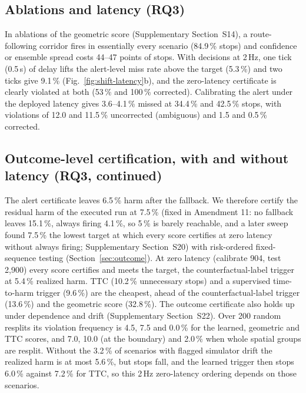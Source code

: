 \documentclass[lettersize,journal]{IEEEtran}
\begin{document}
\subsection{Ablations and latency (RQ3)}
\label{sec:ablation}
In ablations of the geometric score (Supplementary Section~S14), a route-following
corridor fires in essentially every scenario (84.9\,\% stops) and confidence or
ensemble spread costs 44--47 points of stops. With decisions at 2\,Hz, one tick (0.5\,s) of delay lifts the
alert-level miss rate above the target (5.3\,\%) and two ticks give 9.1\,\%
(Fig.~\ref{fig:shift-latency}b), and the zero-latency certificate is
clearly violated at both (53\,\% and 100\,\% corrected). Calibrating the
alert under the deployed latency gives 3.6--4.1\,\% missed at 34.4\,\% and
42.5\,\% stops, with violations of 12.0 and 11.5\,\% uncorrected (ambiguous)
and 1.5 and 0.5\,\% corrected.

\subsection{Outcome-level certification, with and without latency (RQ3, continued)}
\label{sec:res-outcome}
The alert certificate leaves 6.5\,\% harm after the fallback. We therefore
certify the residual harm of the executed run at 7.5\,\% (fixed in Amendment 11: no fallback leaves
15.1\,\%, always firing 4.1\,\%, so 5\,\% is barely reachable, and a
later sweep found 7.5\,\% the lowest target at which every score certifies at zero
latency without always firing; Supplementary Section~S20) with
risk-ordered fixed-sequence testing (Section~\ref{sec:outcome}). At zero
latency (calibrate 904, test 2{,}900) every score certifies and meets the
target, the counterfactual-label trigger at 5.4\,\% realized harm. TTC
(10.2\,\% unnecessary stops) and a supervised time-to-harm trigger (9.6\,\%)
are the cheapest, ahead of the counterfactual-label trigger (13.6\,\%) and
the geometric score (32.8\,\%). The outcome certificate also holds up under
dependence and drift (Supplementary Section~S22). Over 200 random resplits
its violation frequency is 4.5, 7.5 and 0.0\,\% for the learned, geometric and
TTC scores, and 7.0, 10.0 (at the boundary) and 2.0\,\% when whole spatial
groups are resplit. Without the 3.2\,\% of scenarios with flagged simulator
drift the realized harm is at most 5.6\,\%, but stops fall, and the learned
trigger then stops 6.0\,\% against 7.2\,\% for TTC, so this 2\,Hz zero-latency
ordering depends on those scenarios.
\end{document}
